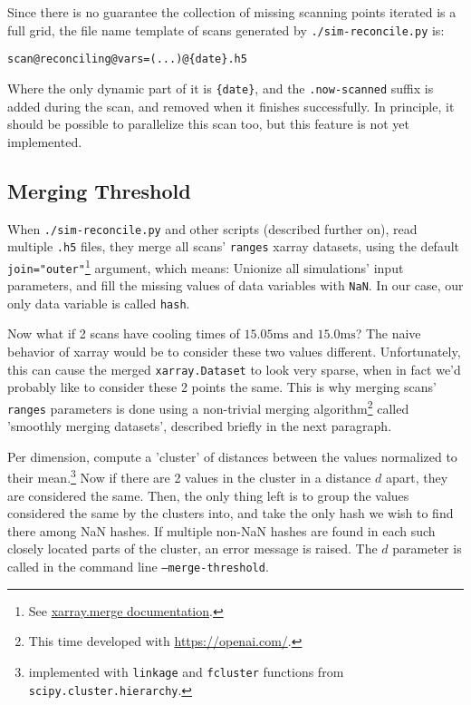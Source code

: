 Since there is no guarantee the collection of missing scanning points iterated is a full grid, the file name template of scans generated by \texttt{./sim-reconcile.py} is:

\begin{verbatim}
scan@reconciling@vars=(...)@{date}.h5
\end{verbatim}

Where the only dynamic part of it is \texttt{\{date\}}, and the \texttt{.now-scanned} suffix is added during the scan, and removed when it finishes successfully. In principle, it should be possible to parallelize this scan too, but this feature is not yet implemented.

\subsection{Merging Threshold}\label{ssec:manual/merge-threshold}

When \texttt{./sim-reconcile.py} and other scripts (described further on), read multiple \texttt{.h5} files, they merge all scans' \texttt{ranges} xarray datasets, using the default \texttt{join="outer"}\footnote{See \href{https://docs.xarray.dev/en/stable/generated/xarray.merge.html}{xarray.merge documentation}.} argument, which means: Unionize all simulations' input parameters, and fill the missing values of data variables with \texttt{NaN}. In our case, our only data variable is called \texttt{hash}.

Now what if 2 scans have cooling times of $15.05\mathrm{ms}$ and $15.0\mathrm{ms}$? The naive behavior of xarray would be to consider these two values different. Unfortunately, this can cause the merged \texttt{xarray.Dataset} to look very sparse, when in fact we'd probably like to consider these 2 points the same. This is why merging scans' \texttt{ranges} parameters is done using a non-trivial merging algorithm\footnote{This time developed with \url{https://openai.com/}.} called 'smoothly merging datasets', described briefly in the next paragraph.

Per dimension, compute a 'cluster' of distances between the values normalized to their mean.\footnote{implemented with \texttt{linkage} and \texttt{fcluster} functions from \texttt{scipy.cluster.hierarchy}.} Now if there are 2 values in the cluster in a distance $d$ apart, they are considered the same. Then, the only thing left is to group the values considered the same by the clusters into, and take the only hash we wish to find there among NaN hashes. If multiple non-NaN hashes are found in each such closely located parts of the cluster, an error message is raised. The $d$ parameter is called in the command line \texttt{--merge-threshold}.

